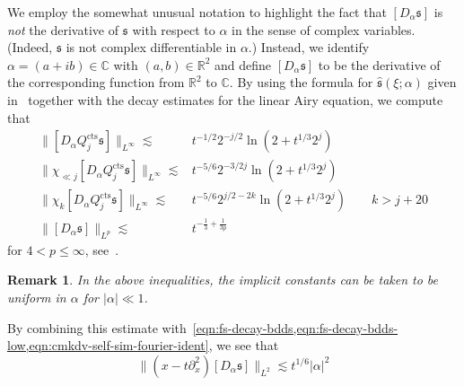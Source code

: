 \documentclass[letterpaper, reqno,final]{amsart}
\newcommand{\bbR}{\mathbb{R}}
\newcommand{\bbC}{\mathbb{C}}
\newcommand{\fs}{\mathfrak{s}}
\newcommand{\tcts}{\text{cts}}
\newtheorem{rmk}{Remark}
\begin{document}
We employ the somewhat unusual notation to highlight the fact that $[D_\alpha \fs]$ is \emph{not} the derivative of $\fs$ with respect to $\alpha$ in the sense of complex variables.  (Indeed, $\fs$ is not complex differentiable in $\alpha$.)  Instead, we identify $\alpha = (a + ib) \in \bbC$ with $(a,b) \in \bbR^2$ and define $[D_\alpha \fs]$ to be the derivative of the corresponding function from $\bbR^2$ to $\bbC$.  By using the formula for $\hat{\fs}(\xi;\alpha)$ given in~\cite{correiaAsymptoticsFourierSpace2020} together with the decay estimates for the linear Airy equation, we compute that
\begin{equation}\label{eqn:D-alpha-fs-bdds}\begin{split}
    \lVert [D_\alpha Q_{j}^\tcts \fs] \rVert_{L^\infty} \lesssim& t^{-1/2} 2^{-j/2} \ln(2 + t^{1/3} 2^j)\\
    \lVert \chi_{\ll j} [D_\alpha Q_{j}^\tcts \fs] \rVert_{L^\infty} \lesssim& t^{-5/6} 2^{-3/2j} \ln(2 + t^{1/3} 2^j)\\
    \lVert \chi_{k} [D_\alpha Q_{j}^\tcts \fs] \rVert_{L^\infty} \lesssim& t^{-5/6} 2^{j/2 - 2k} \ln(2 + t^{1/3} 2^j)\qquad k > j + 20\\
    \lVert [D_\alpha \fs] \rVert_{L^p} \lesssim& t^{-\frac{1}{3} + \frac{1}{3p}}
\end{split}\end{equation}
for $4 < p \leq \infty$, see~\cite[Section 4]{stewartLongTimeDecay2021}.
\begin{rmk}\label{rmk:D-alpha-unif}
    In the above inequalities, the implicit constants can be taken to be uniform in $\alpha$ for $|\alpha| \ll 1$.
\end{rmk}
By combining this estimate with~\cref{eqn:fs-decay-bdds,eqn:fs-decay-bdds-low,eqn:cmkdv-self-sim-fourier-ident}, we see that
\begin{equation}\label{eqn:D-alpha-L-fs-bdds}
    \lVert (x - t\partial_x^2)[D_\alpha \fs] \rVert_{L^2} \lesssim t^{1/6} |\alpha|^2
\end{equation}
\end{document}

